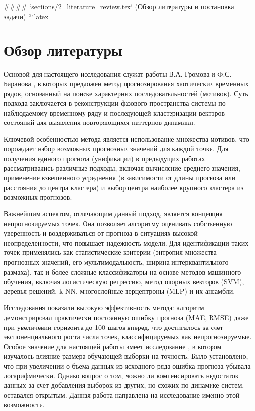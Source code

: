 #### `sections/2_literature_review.tex` (Обзор литературы и постановка задачи)
```latex
\section{Обзор литературы}

Основой для настоящего исследования служат работы В.А. Громова и Ф.С. Баранова  \cite{GromovBaranov2023}
, в которых предложен метод прогнозирования хаотических временных рядов,
 основанный на поиске характерных последовательностей (мотивов).
  Суть подхода заключается в реконструкции фазового пространства
   системы по наблюдаемому временному ряду и последующей кластеризации
   векторов состояний для выявления повторяющихся паттернов динамики.

Ключевой особенностью метода является использование множества мотивов,
что порождает набор возможных прогнозных значений для каждой точки.
 Для получения единого прогноза (унификации) в предыдущих работах
  рассматривались различные подходы, включая вычисление среднего
   значения, применение взвешенного усреднения (в зависимости от длины прогноза или расстояния
    до центра кластера) и выбор центра наиболее крупного кластера из возможных прогнозов.

Важнейшим аспектом, отличающим данный подход, является концепция
непрогнозируемых точек. Она позволяет алгоритму оценивать собственную уверенность
 и воздерживаться от прогноза в ситуациях высокой неопределенности,
 что повышает надежность модели. Для идентификации таких точек применялись
 как статистические критерии (энтропия множества прогнозных значений, его
 мультимодальность, ширина интерквантильного размаха), так и более сложные
 классификаторы на основе методов машинного обучения, включая логистическую регрессию,
  метод опорных векторов (SVM), деревья решений, k-NN, многослойные перцептроны (MLP) и их ансамбли.\cite{Wang2019}

Исследования показали высокую эффективность метода: алгоритм демонстрировал
практически постоянную ошибку прогноза (MAE, RMSE) даже при увеличении
горизонта до 100 шагов вперед, что достигалось за счет экспоненциального
 роста числа точек, классифицируемых как непрогнозируемые. Особое значение
  для настоящей работы имеет исследование  \cite{Gromov2021}, в котором изучалось влияние
  размера обучающей выборки на точность. Было установлено, что при увеличении о
  бъема данных из исходного ряда ошибка прогноза убывала логарифмически. Однако
  вопрос о том, можно ли компенсировать недостаток данных за счет добавления
  выборок из других, но схожих по динамике систем, оставался открытым.
 Данная работа направлена на исследование именно этой возможности.

